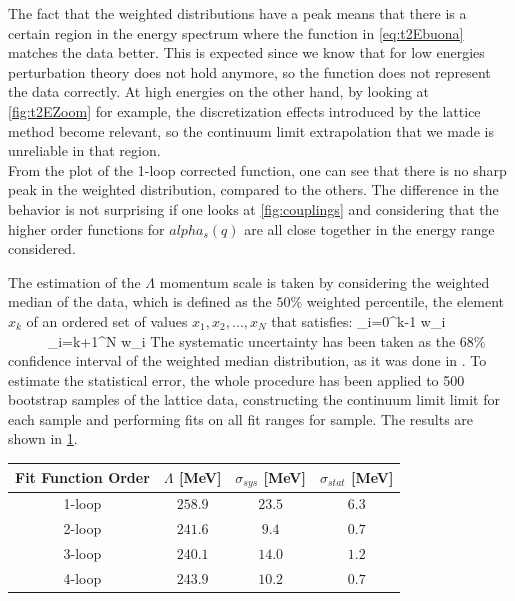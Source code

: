 The fact that the weighted distributions have a peak means that there is a certain region in the energy spectrum where the function in \cref{eq:t2Ebuona} matches the data better. This is expected since we know that for low energies perturbation theory does not hold anymore, so the function does not represent the data correctly. At high energies on the other hand, by looking at \cref{fig:t2EZoom} for example, the discretization effects introduced by the lattice method become relevant, so the continuum limit extrapolation that we made is unreliable in that region.\\
From the plot of the 1-loop corrected function, one can see that there is no sharp peak in the weighted distribution, compared to the others. The difference in the behavior is not surprising if one looks at \cref{fig:couplings} and considering that the higher order functions for $alpha_s(q)$ are all close together in the energy range considered. 

The estimation of the $\Lambda$ momentum scale is taken by considering the weighted median of the data, which is defined as the $50\%$ weighted percentile, the element $x_k$ of an ordered set of values $x_1, x_2, \dots, x_N$ that satisfies:
\beq
    \sum_{i=0}^{k-1} w_i \leq {} ~~~~   ~~~~~ \sum_{i=k+1}^{N} w_i \geq {}
\eeq
The systematic uncertainty has been taken as the $68\%$ confidence interval of the weighted median distribution, as it was done in \cite{durr_ab-initio_2008-1}. To estimate the statistical error, the whole procedure has been applied to 500 bootstrap samples of the lattice data, constructing the continuum limit limit for each sample and performing fits on all fit ranges for sample. The results are shown in \cref{lambda_table}.

\begin{table}[!htb]
    \begin{center}
    \begin{tabular}{cccc} 
        Fit Function Order & $\Lambda$ [MeV]& $\sigma_{sys}$ [MeV]& $\sigma_{stat}$ [MeV]\\\hline
        1-loop & $258.9$ & $23.5$ & $6.3$ \\
        2-loop & $241.6$ & $9.4$  & $0.7$ \\
        3-loop & $240.1$ & $14.0$ & $1.2$ \\
        4-loop & $243.9$ & $10.2$ & $0.7$ 
    \end{tabular}
    \label{lambda_table} 
    \end{center}
\end{table}

